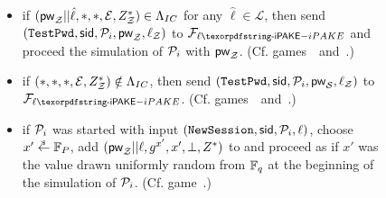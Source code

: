 \begin{figure}[ht!]
\begin{fboxenv}
\begin{minipage}{0.95\textwidth}
\begin{itemize}
        \begin{itemize}
         \item if $(\mathsf{pw}_\mathcal{Z}||\hat\ell,*,*,\mathcal{E},Z^*_\mathcal{Z})\in\Lambda_{IC}$ for any $\hat\ell\in\mathcal{L}$, then send $(\texttt{TestPwd},\mathsf{sid},\mathcal{P}_{i},\mathsf{pw}_\mathcal{Z},\ell_\mathcal{Z})$ to $\FliPAKE$ and proceed the simulation of $\mathcal{P}_{i}$ with $\mathsf{pw}_\mathcal{Z}$. (Cf. games~~and~.)
         \item if $(*,*,*,\mathcal{E},Z^*_\mathcal{Z})\notin\Lambda_{IC}$, then send $(\texttt{TestPwd},\mathsf{sid},\mathcal{P}_{i},\mathsf{pw}_\mathcal{S},\ell_\mathcal{Z})$ to $\FliPAKE$. (Cf. games~~and~.)
         \item if $\mathcal{P}_{i}$ was started with input $(\texttt{NewSession},\mathsf{sid},\mathcal{P}_{i},\ell)$, choose $x'\stackrel{{}_\$}{\leftarrow}\mathbb{F}_P$, add $(\mathsf{pw}_\mathcal{Z}||\ell,g^{x'},x',\bot,Z^*)$ to \ListIC and proceed as if $x'$ was the value drawn uniformly random from $\mathbb{F}_q$ at the beginning of the simulation of $\mathcal{P}_{i}$. (Cf. game~.)
        \end{itemize}


\end{itemize}
\end{minipage}
\end{fboxenv}
\end{figure}
